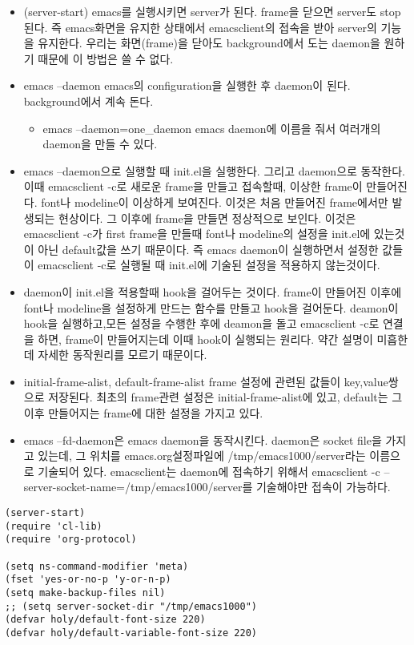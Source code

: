 \documentclass[11pt]{article}
\begin{document}
\begin{itemize}
\item (server-start)
emacs를 실행시키면 server가 된다. frame을 닫으면 server도 stop된다. 즉 emacs화면을 유지한 상태에서 emacsclient의 접속을 받아 server의 기능을 유지한다. 우리는 화면(frame)을 닫아도 background에서 도는 daemon을 원하기 때문에 이 방법은 쓸 수 없다.
\item emacs --daemon
emacs의 configuration을 실행한 후 daemon이 된다. background에서 계속 돈다.
\begin{itemize}
\item emacs --daemon=one\_daemon
emacs daemon에 이름을 줘서 여러개의 daemon을 만들 수 있다.
\end{itemize}

\item\relax [문제]
emacs --daemon으로 실행할 때 init.el을 실행한다. 그리고 daemon으로 동작한다. 이때 emacsclient -c로 새로운 frame을 만들고 접속할때, 이상한 frame이 만들어진다. font나 modeline이 이상하게 보여진다. 이것은 처음 만들어진 frame에서만 발생되는 현상이다. 그 이후에 frame을 만들면 정상적으로 보인다. 이것은 emacsclient -c가 first frame을 만들때 font나 modeline의 설정을 init.el에 있는것이 아닌 default값을 쓰기 때문이다. 즉 emacs daemon이 실행하면서 설정한 값들이 emacsclient -c로  실행될 때 init.el에 기술된 설정을 적용하지 않는것이다.
\item\relax [해결법]
daemon이 init.el을 적용할때 hook을 걸어두는 것이다. frame이 만들어진 이후에 font나 modeline을 설정하게 만드는 함수를 만들고 hook을 걸어둔다. deamon이 hook을 실행하고,모든 설정을 수행한 후에 deamon을 돌고 emacsclient -c로 연결을 하면, frame이 만들어지는데 이때 hook이 실행되는 원리다. 약간 설명이 미흡한데 자세한 동작원리를 모르기 때문이다.

\item initial-frame-alist, default-frame-alist
frame 설정에 관련된 값들이 key,value쌍으로 저장된다. 최초의 frame관련 설정은 initial-frame-alist에 있고, default는 그 이후 만들어지는 frame에 대한 설정을 가지고 있다.

\item{}
emacs --fd-daemon은 emacs daemon을 동작시킨다. daemon은 socket file을 가지고 있는데, 그 위치를 emacs.org설정파일에 /tmp/emacs1000/server라는 이름으로 기술되어 있다. emacsclient는 daemon에 접속하기 위해서 emacsclient -c --server-socket-name=/tmp/emacs1000/server를 기술해야만 접속이 가능하다.
\end{itemize}

\begin{verbatim}
(server-start)
(require 'cl-lib)
(require 'org-protocol)

(setq ns-command-modifier 'meta)
(fset 'yes-or-no-p 'y-or-n-p)
(setq make-backup-files nil)
;; (setq server-socket-dir "/tmp/emacs1000")
(defvar holy/default-font-size 220)
(defvar holy/default-variable-font-size 220)
\end{verbatim}
\end{document}
